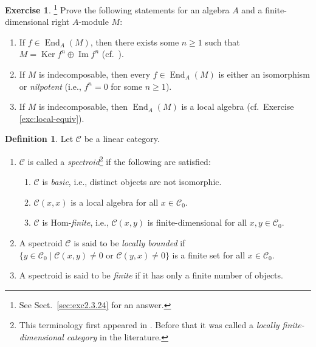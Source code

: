 \documentclass{surv-l}
\numberwithin{equation}{chapter}
\numberwithin{figure}{chapter}
\theoremstyle{plain}
\theoremstyle{definition}
\newtheorem{dfn}[thm]{Definition}
\newtheorem{exc}[thm]{Exercise}
\theoremstyle{remark}
\DeclareMathOperator{\Ker}{Ker}
\DeclareMathOperator{\End}{End}
\begin{document}
\begin{exc}\hspace{-1.2ex}\footnote{See Sect.\ \ref{sec:exc2.3.24} for an answer.}
\label{exc:fd-ind-local-endo}\label{ex:2.3.24}
Prove the following statements
for an algebra $A$ and a finite-dimensional right $A$-module $M$:
\begin{enumerate}
\item
If $f \in \End_A(M)$, then there exists some $n \ge 1$ such that
$M = \Ker f^n \oplus \operatorname{Im} f^n$ (cf.\ \cite[Fitting's Lemma]{GTM13}).
\item
If $M$ is indecomposable, then every $f \in \End_A(M)$
is either an isomorphism or \emph{nilpotent} (i.e., $f^n =0$ for some $n \ge 1$).
\item
If $M$ is indecomposable, then $\End_A(M)$ is a local algebra
(cf.\ Exercise \ref{exc:local-equiv}).
\end{enumerate}
\end{exc}

\begin{dfn}
Let ${\mathcal{C}}$ be a linear category.
\begin{enumerate}
\item
${\mathcal{C}}$ is called a \emph{spectroid}\footnote{This terminology first appeared in \cite{G-R}.  Before that it was called a {\em locally finite-dimensional category} in the literature.}
if the following are satisfied:
\begin{enumerate}
\item
${\mathcal{C}}$ is \emph{basic}, i.e., distinct objects are not isomorphic.
\item
$\mathcal{C}(x,x)$ is a local algebra for all $x \in \mathcal{C}_0$.
\item
${\mathcal{C}}$ is {\rm Hom}-\emph{finite}, i.e.,
${\mathcal{C}}(x, y)$ is finite-dimensional for all $x, y \in {\mathcal{C}}_0$.
\end{enumerate}
\item
A spectroid ${\mathcal{C}}$ is said to be \emph{locally bounded} if
$\{y \in {\mathcal{C}}_0 \mid {\mathcal{C}}(x, y) \ne 0 \text{ or }
{\mathcal{C}}(y, x) \ne 0\}$ is a finite set for all $x \in {\mathcal{C}}_0$.
\item
A spectroid is said to be \emph{finite} if it has only a finite number of objects.
\end{enumerate}
\end{dfn}
\end{document}
